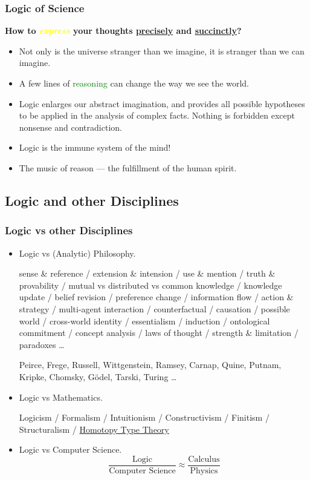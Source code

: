 \documentclass[UTF8,11pt,colorlinks,compress,openany]{beamer}%
\begin{document}
\begin{frame}\frametitle{Logic of Science}
	\begin{block}{}
		\begin{center}
			\textbf{\large{How to \textcolor{yellow}{\textit{express}} your thoughts \underline{precisely} and \underline{succinctly}?}}
		\end{center}
	\end{block}
	\begin{itemize}
		\item Not only is the universe stranger than we imagine, it is stranger than we can imagine.
		\item A few lines of \textcolor{green}{reasoning} can change the way we see the world.
		\item Logic enlarges our abstract imagination, and provides all possible hypotheses to be applied in the analysis of complex facts. Nothing is forbidden except nonsense and contradiction.
		\item Logic is the immune system of the mind!
		\item The music of reason --- the fulfillment of the human spirit.
	\end{itemize}
\end{frame}

\subsection{Logic and other Disciplines}

\begin{frame}\frametitle{Logic vs other Disciplines}
		\begin{itemize}
			\item Logic vs (Analytic) Philosophy.
			
			sense \& reference / extension \& intension / use \& mention / truth \& provability / mutual vs distributed vs common knowledge / knowledge update / belief revision / preference change / information flow / action \& strategy / multi-agent interaction / counterfactual / causation / possible world / cross-world identity / essentialism / induction / ontological commitment / concept analysis / laws of thought / strength \& limitation / paradoxes \dots
			
			Peirce, Frege, Russell, Wittgenstein, Ramsey, Carnap, Quine, Putnam, Kripke, Chomsky, G\"odel, Tarski, Turing \dots
			\item Logic vs Mathematics.
			
			Logicism / Formalism / Intuitionism / Constructivism / Finitism / Structuralism / \href{https://homotopytypetheory.org/book/}{Homotopy Type Theory}
			\item Logic vs Computer Science.
			\[\dfrac{\text{Logic}}{\text{Computer Science}} \approx \dfrac{\text{Calculus}}{\text{Physics}}\]
		\end{itemize}
\end{frame}
\end{document}
